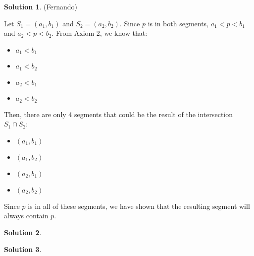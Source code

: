\documentclass{article}
\theoremstyle{definition}
\newtheorem{solution}{Solution}
\begin{document}
\begin{solution} %
(Fernando)

Let $S_1 = (a_1, b_1)$ and $S_2 = (a_2, b_2)$.
Since $p$ is in both segments, $a_1 < p < b_1$ and $a_2 < p < b_2$.
From Axiom 2, we know that:

\begin{itemize}
\item $a_1 < b_1$
\item $a_1 < b_2$
\item $a_2 < b_1$
\item $a_2 < b_2$
\end{itemize}

Then, there are only 4 segments that could be the result of the intersection $S_1 \cap S_2$:

\begin{itemize}
\item $(a_1, b_1)$
\item $(a_1, b_2)$
\item $(a_2, b_1)$
\item $(a_2, b_2)$
\end{itemize}

Since $p$ is in all of these segments, we have shown that the resulting segment will always contain $p$.
\end{solution}

\begin{solution}
\end{solution}

\begin{solution}
\end{solution}
\end{document}

